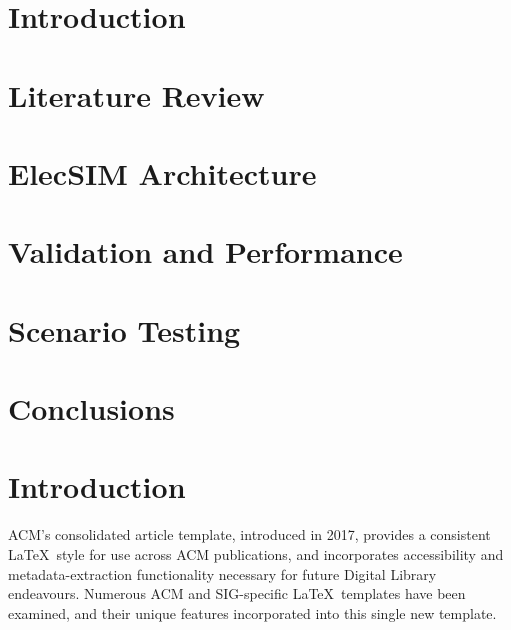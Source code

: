 \documentclass[sigconf]{acmart}
\begin{document}
%

%
\maketitle


\section{Introduction}


\section{Literature Review}\label{Literature Review}

\section{ElecSIM Architecture} \label{Model}


\section{Validation and Performance}\label{Valdiation and Performance}


\section{Scenario Testing}\label{Scenario Testing}




\section{Conclusions}\label{Conclusion}




\newpage
\newpage


\section{Introduction}
ACM's consolidated article template, introduced in 2017, provides a consistent \LaTeX\ style for use across ACM publications, and incorporates accessibility and metadata-extraction functionality necessary for future Digital Library endeavours. Numerous ACM and SIG-specific \LaTeX\ templates have been examined, and their unique features incorporated into this single new template.
\end{document}
